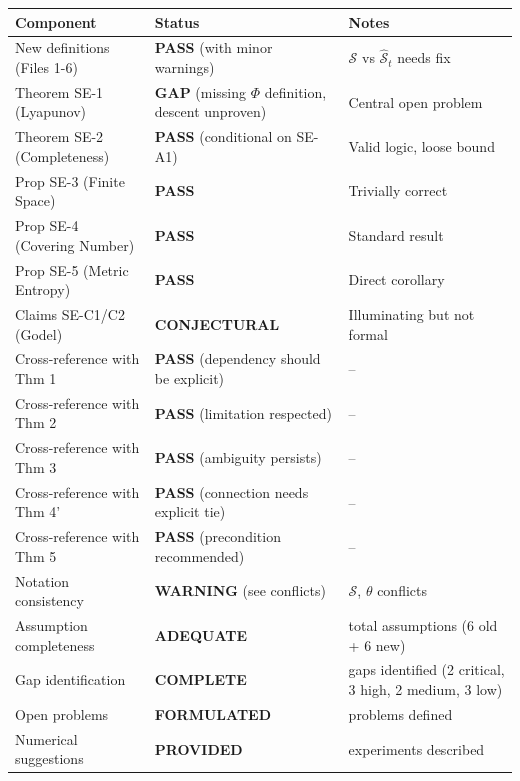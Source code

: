 \documentclass[
  12pt,
]{article}
\begin{document}
\begin{longtable}[]{@{}
  >{\raggedright\arraybackslash}p{}
  >{\raggedright\arraybackslash}p{}
  >{\raggedright\arraybackslash}p{}@{}}
\toprule\noalign{}
\begin{minipage}[b]{\linewidth}\raggedright
Component
\end{minipage} & \begin{minipage}[b]{\linewidth}\raggedright
Status
\end{minipage} & \begin{minipage}[b]{\linewidth}\raggedright
Notes
\end{minipage} \\
\midrule\noalign{}
\endhead
\bottomrule\noalign{}
\endlastfoot
New definitions (Files 1-6) & \textbf{PASS} (with minor warnings) &
\(\mathcal{S}\) vs \(\hat{\mathcal{S}}_t\) needs fix \\
Theorem SE-1 (Lyapunov) & \textbf{GAP} (missing \(\Phi\) definition,
descent unproven) & Central open problem \\
Theorem SE-2 (Completeness) & \textbf{PASS} (conditional on SE-A1) &
Valid logic, loose bound \\
Prop SE-3 (Finite Space) & \textbf{PASS} & Trivially correct \\
Prop SE-4 (Covering Number) & \textbf{PASS} & Standard result \\
Prop SE-5 (Metric Entropy) & \textbf{PASS} & Direct corollary \\
Claims SE-C1/C2 (Godel) & \textbf{CONJECTURAL} & Illuminating but not
formal \\
Cross-reference with Thm 1 & \textbf{PASS} (dependency should be
explicit) & -- \\
Cross-reference with Thm 2 & \textbf{PASS} (limitation respected) &
-- \\
Cross-reference with Thm 3 & \textbf{PASS} (ambiguity persists) & -- \\
Cross-reference with Thm 4' & \textbf{PASS} (connection needs explicit
tie) & -- \\
Cross-reference with Thm 5 & \textbf{PASS} (precondition recommended) &
-- \\
Notation consistency & \textbf{WARNING} (see conflicts) &
\(\mathcal{S}\), \(\theta\) conflicts \\
Assumption completeness & \textbf{ADEQUATE} & 12 total assumptions (6
old + 6 new) \\
Gap identification & \textbf{COMPLETE} & 10 gaps identified (2 critical,
3 high, 2 medium, 3 low) \\
Open problems & \textbf{FORMULATED} & 5 problems defined \\
Numerical suggestions & \textbf{PROVIDED} & 5 experiments described \\
\end{longtable}
\end{document}
